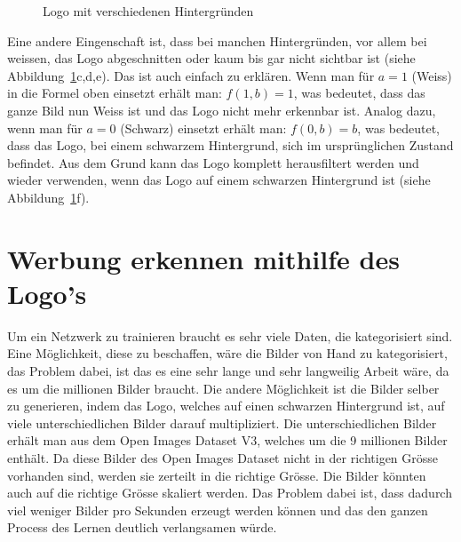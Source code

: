 \documentclass[12pt,a4paper]{report}
\begin{document}
\begin{figure}[h]
    \qquad
    \qquad
    \caption{Logo mit verschiedenen Hintergründen}%
    \label{fig:logo5}%
\end{figure}
Eine andere Eingenschaft ist, dass bei manchen Hintergründen,
vor allem bei weissen, das Logo abgeschnitten oder kaum bis gar nicht sichtbar ist (siehe Abbildung~\ref{fig:logo5}c,d,e).
Das ist auch einfach zu erklären.
Wenn man für $a = 1$ (Weiss) in die Formel oben einsetzt erhält man: $f(1, b) = 1$, was bedeutet, dass das ganze Bild nun Weiss ist und das Logo nicht mehr erkennbar ist.
Analog dazu, wenn man für $a = 0$ (Schwarz) einsetzt erhält man: $f(0, b) = b$, was bedeutet, dass das Logo, bei einem schwarzem Hintergrund,
sich im ursprünglichen Zustand befindet.
Aus dem Grund kann das Logo komplett herausfiltert werden und wieder verwenden, wenn das Logo auf einem schwarzen Hintergrund ist (siehe Abbildung~\ref{fig:logo5}f).

\section{Werbung erkennen mithilfe des Logo's}
Um ein Netzwerk zu trainieren braucht es sehr viele Daten, die kategorisiert sind.
Eine Möglichkeit, diese zu beschaffen, wäre die Bilder von Hand zu kategorisiert, das Problem dabei, ist das es eine sehr lange und sehr langweilig Arbeit wäre,
da es um die millionen Bilder braucht.
Die andere Möglichkeit ist die Bilder selber zu generieren,
indem das Logo, welches auf einen schwarzen Hintergrund ist, auf viele unterschiedlichen Bilder darauf multipliziert.
Die unterschiedlichen Bilder erhält man aus dem Open Images Dataset V3\cite{openimages}, welches um die 9 millionen Bilder enthält.
Da diese Bilder des Open Images Dataset nicht in der richtigen Grösse vorhanden sind, werden sie zerteilt in die richtige Grösse.
Die Bilder könnten auch auf die richtige Grösse skaliert werden.
Das Problem dabei ist, dass dadurch viel weniger Bilder pro Sekunden erzeugt werden können und das den ganzen Process des Lernen deutlich verlangsamen würde.
\end{document}
